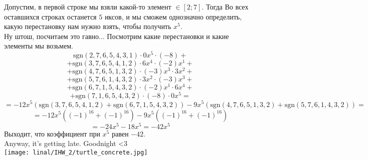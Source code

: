 \documentclass[17pt]{article}
\begin{document}
Допустим, в первой строке мы взяли какой-то элемент $\in [2; 7]$. Тогда Во всех оставшихся строках останется $5$ иксов, и мы сможем однозначно определить, какую перестановку нам нужно взять, чтобы получить $x^5$.
\\
Ну штош, посчитаем это гавно... Посмотрим какие перестановки и какие элементы мы возьмем.
\\
$$ 
  \text{sgn}(2, 7, 6, 5, 4, 3, 1)\cdot0x^5\cdot(-8) +
$$
$$
+ \text{sgn}(3, 7, 6, 5, 4, 1, 2)\cdot6x^4\cdot(-2)x^1 +
$$
$$
+ \text{sgn}(4, 7, 6, 5, 1, 3, 2)\cdot(-3)x^3\cdot3x^2 +
$$
$$
+ \text{sgn}(5, 7, 6, 1, 4, 3, 2)\cdot3x^2\cdot(-3)x^3 +
$$
$$
+ \text{sgn}(6, 7, 1, 5, 4, 3, 2)\cdot(-2)x^1\cdot6x^4 +
$$
$$
+ \text{sgn}(7, 1, 6, 5, 4, 3, 2)\cdot(-8)\cdot0x^5 =
$$
$$
= -12x^5(\text{sgn}(3, 7, 6, 5, 4, 1, 2) + \text{sgn}(6, 7, 1, 5, 4, 3, 2)) -9x^5(\text{sgn}(4, 7, 6, 5, 1, 3, 2) + \text{sgn}(5, 7, 6, 1, 4, 3, 2)) = 
$$
$$
= -12x^5((-1)^{16} + (-1)^{16}) - 9x^5((-1)^{16} + (-1)^{16})
$$
$$
= -24x^5 - 18x^5 = -42x^5
$$
Выходит, что коэффициент при $x^5$ равен $-42$.
\\
Anyway, it's getting late. Goodnight <3
\\
\texttt{[image: linal/IHW\_2/turtle\_concrete.jpg]}
\end{document}
